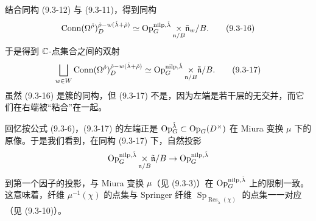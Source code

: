 结合同构 (9.3-12) 与 (9.3-11)，得到同构
\begin{equation}
\operatorname{Conn}(\Omega^{\check\rho})^{\check\rho-w(\check\lambda+\check\rho)}_D\simeq\operatorname{Op}^{\mathrm{nilp},\check\lambda}_G\underset{\mathfrak{n}/B}{\times}\tilde{\mathfrak{n}}_w/B.
\tag{9.3-16}
\end{equation}
于是得到 $\mathbb{C}$-点集合之间的双射
\begin{equation}
\bigsqcup_{w\in W}\operatorname{Conn}(\Omega^{\check\rho})^{\check\rho-w(\check\lambda+\check\rho)}_D\simeq\operatorname{Op}^{\mathrm{nilp},\check\lambda}_G\underset{\mathfrak{n}/B}{\times}\tilde{\mathfrak{n}}/B.
\tag{9.3-17}
\end{equation}
虽然 (9.3-16) 是簇的同构，但 (9.3-17) 不是，因为左端是若干层的无交并，而它们在右端被“粘合”在一起。

回忆按公式 (9.3-6)，(9.3-17) 的左端正是 $\operatorname{Op}^{\check\lambda}_G\subset\operatorname{Op}_G(D^\times)$ 在 Miura 变换 $\mu$ 下的原像。于是我们看到，在同构 (9.3-17) 下，自然投影
\[
\operatorname{Op}^{\mathrm{nilp},\check\lambda}_G\underset{\mathfrak{n}/B}{\times}\tilde{\mathfrak{n}}/B\to\operatorname{Op}^{\mathrm{nilp},\check\lambda}_G
\]
到第一个因子的投影，与 Miura 变换 $\mu$（见 (9.3-3)）在 $\operatorname{Op}^{\mathrm{nilp},\check\lambda}_G$ 上的限制一致。这意味着，纤维 $\mu^{-1}(\chi)$ 的点集与 Springer 纤维 $\operatorname{Sp}_{\operatorname{Res}_{\check\lambda}(\chi)}$ 的点集一一对应（见 (9.3-10)）。

